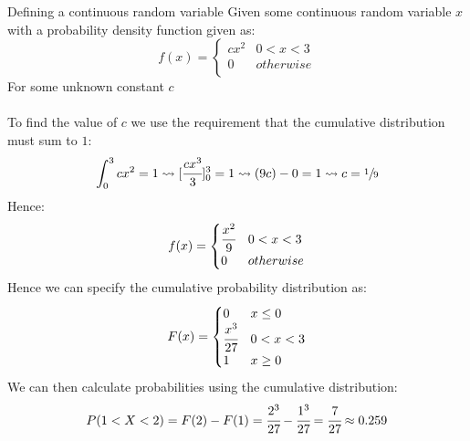 \begin{examplebox}{Defining a continuous random variable}
	Given some continuous random variable $x$ with a probability density function given as:
	\[f(x) = \begin{cases}
			cx^2 & 0 < x < 3 \\
			0    & otherwise \\
		\end{cases}\]
	For some unknown constant $c$
	\\
	\\ To find the value of $c$ we use the requirement that the cumulative distribution must sum to $1$:
	\[\int_0^3 cx^2 = 1 \leadsto [\cfrac{cx^3}{3}]^3_0 = 1 \leadsto (9c) - 0 = 1 \leadsto c = \sfrac{1}{9}\]
	Hence:
	\[f(x) = \begin{cases}
			\cfrac{x^2}{9} & 0 < x < 3 \\
			0              & otherwise \\
		\end{cases}\]
	Hence we can specify the cumulative probability distribution as:
	\[F(x) = \begin{cases}
			0               & x \leq 0  \\
			\cfrac{x^3}{27} & 0 < x < 3 \\
			1               & x \geq 0  \\
		\end{cases}\]
	We can then calculate probabilities using the cumulative distribution:
	\[P(1 < X < 2) = F(2) - F(1) = \cfrac{2^3}{27} - \cfrac{1^3}{27} = \cfrac{7}{27} \approx 0.259\]
\end{examplebox}

